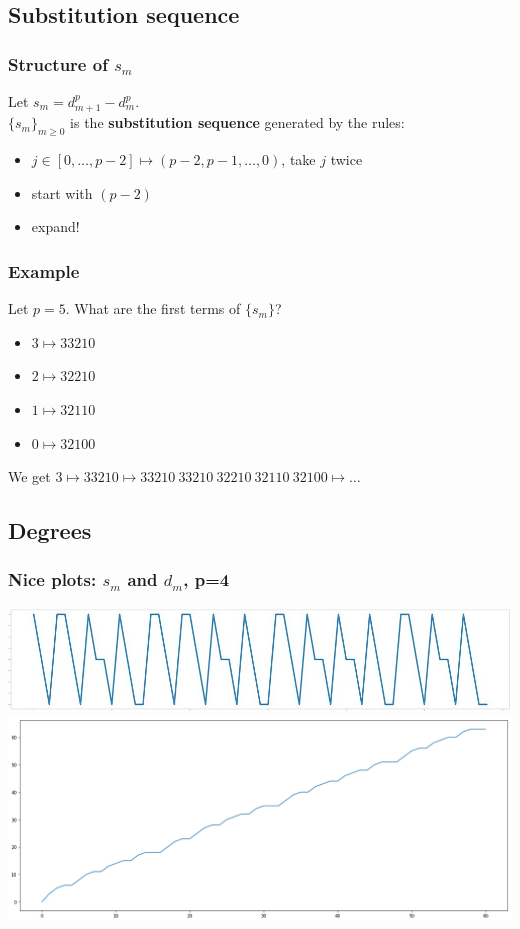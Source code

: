 \subsection{Substitution sequence}
\begin{frame}
\frametitle{Structure of $s_m$}
Let $s_m = d_{m+1}^p-d_m^p$.\bigskip\\

 $\{s_m\}_{m \ge 0}$ is the \textbf{substitution sequence} generated by the rules:
\begin{itemize}
\item $j \in \left[0, \ldots, p-2 \right] \mapsto (p-2, p-1,\ldots,0)$, take $j$ twice
\item start with $(p-2)$
\item expand!
\end{itemize}
\end{frame}

\begin{frame}
\frametitle{Example}
Let $p=5$. What are the first terms of $\{s_m\}$?\bigskip\\

\begin{itemize}
\item $3 \mapsto 33210$
\item $2 \mapsto 32210$
\item $1 \mapsto 32110$
\item $0 \mapsto 32100$
\end{itemize}

We get $3 \mapsto 33210 \mapsto 33210\ 33210\ 32210\ 32110\ 32100 \mapsto \ldots$
\end{frame}

\subsection{Degrees}
\begin{frame}
\frametitle{Nice plots: $s_m$ and $d_m$, p=4}
\center
\includegraphics[width=0.9\linewidth]{s4}\\
\includegraphics[width=0.9\linewidth]{degrees}
\end{frame}

